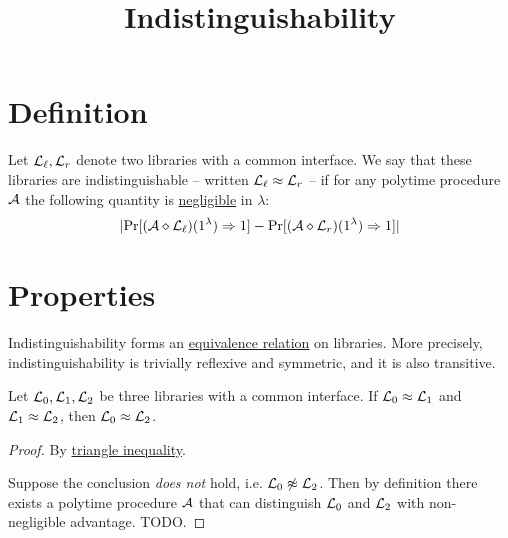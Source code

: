 \documentclass{article}
\title{Indistinguishability}
\begin{document}
\maketitle

\section{Definition}

\begin{definition}[Indistinguishability]
  Let $\mathcal{L}_\ell, \mathcal{L}_r$ denote two libraries with a common interface. We say
  that these libraries are indistinguishable -- written $\mathcal{L}_\ell \approx \mathcal{L}_r$ -- if for any polytime
  procedure $\mathcal{A}$ the following quantity is \href{negligible.html}{negligible} in $\lambda$:
  \begin{align*}
    |\mathrm{Pr}[(\mathcal{A} \diamond \mathcal{L}_\ell)(1^\lambda) \Rightarrow 1]
    -
    \mathrm{Pr}[(\mathcal{A} \diamond \mathcal{L}_r)(1^\lambda) \Rightarrow 1]|
  \end{align*}
\end{definition}

\section{Properties}

Indistinguishability forms an
\href{https://en.wikipedia.org/wiki/Equivalence_relation}{equivalence relation}
on libraries.
More precisely, indistinguishability is trivially reflexive and symmetric, and it is also transitive.

\begin{lemma}
  Let $\mathcal{L}_0, \mathcal{L}_1, \mathcal{L}_2$ be three libraries with a common interface. If
    $\mathcal{L}_0 \approx \mathcal{L}_1$ and $\mathcal{L}_1 \approx \mathcal{L}_2$,
    then $\mathcal{L}_0 \approx \mathcal{L}_2$.
\end{lemma}
\begin{proof}
  By \href{https://en.wikipedia.org/wiki/Triangle_inequality}{triangle inequality}.

  Suppose the conclusion \emph{does not} hold, i.e. $\mathcal{L}_0 \not \approx \mathcal{L}_2$.
  Then by definition there exists a polytime procedure $\mathcal{A}$ that can distinguish $\mathcal{L}_0$ and $\mathcal{L}_2$ with non-negligible advantage.
  TODO.
\end{proof}



\end{document}
